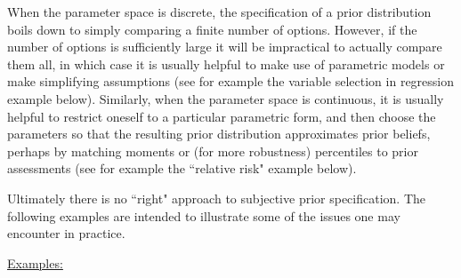 \documentclass[12pt]{article}
\begin{document}
When the parameter space is discrete, the specification of a prior distribution boils down to simply comparing a finite number of options.
However, if the number of options is sufficiently
large it will be impractical to actually compare them all, in which case it is usually helpful to make use of parametric models or make simplifying assumptions (see for example the variable selection in regression example below). Similarly,
when the parameter space is continuous, it is usually helpful to restrict oneself to a particular parametric form, and then choose the parameters 
so that the resulting prior distribution approximates prior beliefs, perhaps by
  matching moments or (for more robustness) percentiles to prior assessments (see for example the ``relative risk" example below). 

Ultimately there is no ``right" approach to subjective prior specification. The following examples are intended to illustrate some of the issues one
may encounter in practice.

\underline{Examples:}
  
\end{document}

